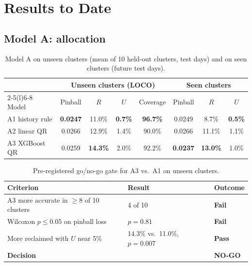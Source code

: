 \documentclass[11pt]{article}
\begin{document}
\section{Results to Date}
\label{sec:results}

\subsection{Model A: allocation}

\begin{table}[h]
\centering\small
\caption{Model A on unseen clusters (mean of 10 held-out clusters, test days) and on seen clusters (future test days).}
\label{tab:modelA}
\begin{tabular}{@{}lcccc@{\hspace{1.2em}}ccc@{}}
\toprule
& \multicolumn{4}{c}{Unseen clusters (LOCO)} & \multicolumn{3}{c}{Seen clusters} \\
\cmidrule(lr){2-5}\cmidrule(l){6-8}
Model & Pinball & $R$ & $U$ & Coverage & Pinball & $R$ & $U$ \\
\midrule
A1 history rule & \textbf{0.0247} & 11.0\% & \textbf{0.7\%} & \textbf{96.7\%} & 0.0249 & 8.7\% & \textbf{0.5\%} \\
A2 linear QR    & 0.0266 & 12.9\% & 1.4\% & 90.0\% & 0.0266 & 11.1\% & 1.1\% \\
A3 XGBoost QR   & 0.0259 & \textbf{14.3\%} & 2.0\% & 92.2\% & \textbf{0.0237} & \textbf{13.0\%} & 1.0\% \\
\bottomrule
\end{tabular}
\end{table}

\begin{table}[h]
\centering\small
\caption{Pre-registered go/no-go gate for A3 vs.\ A1 on unseen clusters.}
\label{tab:gate}
\begin{tabular}{@{}lll@{}}
\toprule
Criterion & Result & Outcome \\
\midrule
A3 more accurate in $\ge$8 of 10 clusters & 4 of 10 & \textcolor{warn}{\textbf{Fail}} \\
Wilcoxon $p \le 0.05$ on pinball loss & $p = 0.81$ & \textcolor{warn}{\textbf{Fail}} \\
More reclaimed with $U$ near 5\% & 14.3\% vs.\ 11.0\%, $p = 0.007$ & \textcolor{good}{\textbf{Pass}} \\
\midrule
\textbf{Decision} & & \textbf{NO-GO} \\
\bottomrule
\end{tabular}
\end{table}
\end{document}
